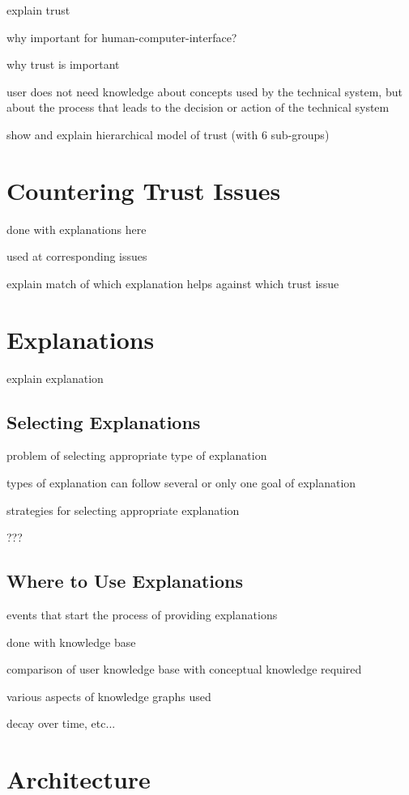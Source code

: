 \documentclass[a4paper]{article}
\begin{document}
explain trust

why important for human-computer-interface?

why trust is important

user does not need knowledge about concepts used by the technical system, but about the process that leads to the decision or action of the technical system

show and explain hierarchical model of trust (with 6 sub-groups)

\section{Countering Trust Issues}

done with explanations here

used at corresponding issues

explain match of which explanation helps against which trust issue

\section{Explanations}

explain explanation

\subsection{Selecting Explanations}

problem of selecting appropriate type of explanation

types of explanation can follow several or only one goal of explanation

strategies for selecting appropriate explanation

???

\subsection{Where to Use Explanations}

events that start the process of providing explanations

done with knowledge base

comparison of user knowledge base with conceptual knowledge required

various aspects of knowledge graphs used

decay over time, etc...

\section{Architecture}
\end{document}
